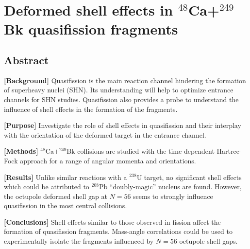 
\chapter{Deformed shell effects in $^{48}$Ca+$^{249}$Bk quasifission fragments}\label{chapters:chapter_7}
\vspace{-7mm}

\author{K. Godbey}
\author{A.S. Umar}
\author{C. Simenel}

\section*{Abstract}

		{\bf [Background]} Quasifission is the main reaction channel hindering the formation of superheavy nuclei (SHN). Its understanding will help to optimize entrance channels for SHN studies. Quasifission also provides a probe to understand the influence of shell effects in the formation of the fragments.
		
		{\bf [Purpose]} Investigate the role of shell effects in quasifission and their interplay with the orientation of the deformed target in the entrance channel.
		
		{\bf [Methods]} $^{48}$Ca$+^{249}$Bk collisions are studied with the time-dependent Hartree-Fock approach for a range of angular momenta and orientations.
		
		{\bf [Results]} Unlike similar reactions with a $^{238}$U target, no significant shell effects which could be attributed to $^{208}$Pb ``doubly-magic'' nucleus are found. However, the octupole deformed shell gap at $N=56$ seems to strongly influence quasifission in the most central collisions.
		
		{\bf [Conclusions]} Shell effects similar to those observed in fission affect the formation of quasifission fragments. Mass-angle correlations could be used to experimentally isolate the fragments influenced by $N=56$ octupole shell gaps.


